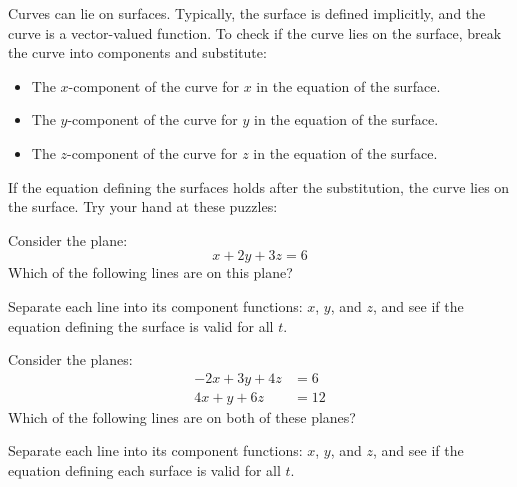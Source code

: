 \documentclass{ximera}
\begin{document}
Curves can lie on surfaces. Typically, the surface is defined
implicitly, and the curve is a vector-valued function. To check if the
curve lies on the surface, break the curve into components and
substitute:
\begin{itemize}
  \item The $x$-component of the curve for $x$ in the equation of the
    surface.
  \item The $y$-component of the curve for $y$ in the equation of
    the surface.
  \item The $z$-component of the curve for $z$ in the equation of the
    surface.
\end{itemize}
If the equation defining the surfaces holds after the substitution, the
curve lies on the surface. Try your hand at these puzzles:

\begin{question}
  Consider the plane:
  \[
  x+2y+3z = 6
  \]
  Which of the following lines are on this plane?
  \begin{hint}
    Separate each line into its component functions: $x$, $y$, and
    $z$, and see if the equation defining the surface is valid for all
    $t$.
  \end{hint}
  \begin{selectAll}
  \end{selectAll}
\end{question}

\begin{question}
  Consider the planes:
  \begin{align*}
    -2x+3y+4z &=6\\
    4x+y+6z &=12
  \end{align*}
    Which of the following lines are on both of these planes?

  \begin{hint}
    Separate each line into its component functions: $x$, $y$, and
    $z$, and see if the equation defining each surface is valid for all
    $t$.
  \end{hint}
 \begin{selectAll}
  \end{selectAll}
\end{question}
\end{document}
